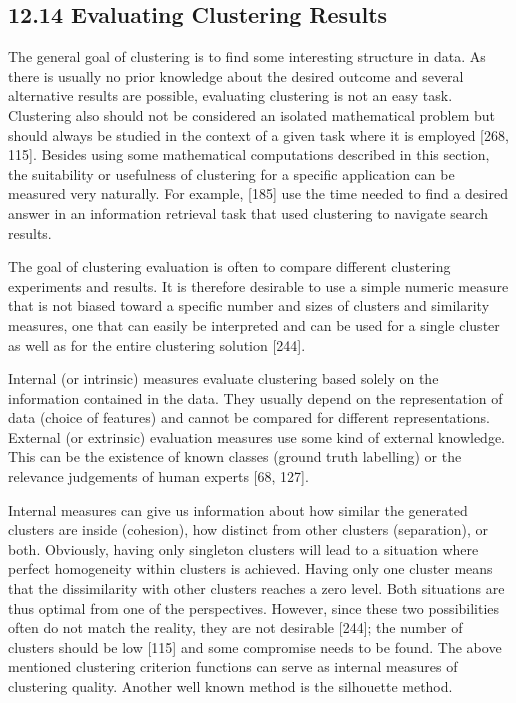 \documentclass[10pt]{book}
\begin{document}
\subsection*{12.14 Evaluating Clustering Results}
The general goal of clustering is to find some interesting structure in data. As there is usually no prior knowledge about the desired outcome and several alternative results are possible, evaluating clustering is not an easy task. Clustering also should not be considered an isolated mathematical problem but should always be studied in the context of a given task where it is employed [268, 115]. Besides using some mathematical computations described in this section, the suitability or usefulness of clustering for a specific application can be measured very naturally. For example, [185] use the time needed to find a desired answer in an information retrieval task that used clustering to navigate search results.

The goal of clustering evaluation is often to compare different clustering experiments and results. It is therefore desirable to use a simple numeric measure that is not biased toward a specific number and sizes of clusters and similarity measures, one that can easily be interpreted and can be used for a single cluster as well as for the entire clustering solution [244].

Internal (or intrinsic) measures evaluate clustering based solely on the information contained in the data. They usually depend on the representation of data (choice of features) and cannot be compared for different representations. External (or extrinsic) evaluation measures use some kind of external knowledge. This can be the existence of known classes (ground truth labelling) or the relevance judgements of human experts [68, 127].

Internal measures can give us information about how similar the generated clusters are inside (cohesion), how distinct from other clusters (separation), or both. Obviously, having only singleton clusters will lead to a situation where perfect homogeneity within clusters is achieved. Having only one cluster means that the dissimilarity with other clusters reaches a zero level. Both situations are thus optimal from one of the perspectives. However, since these two possibilities often do not match the reality, they are not desirable [244]; the number of clusters should be low [115] and some compromise needs to be found. The above mentioned clustering criterion functions can serve as internal measures of clustering quality. Another well known method is the silhouette method.
\end{document}
